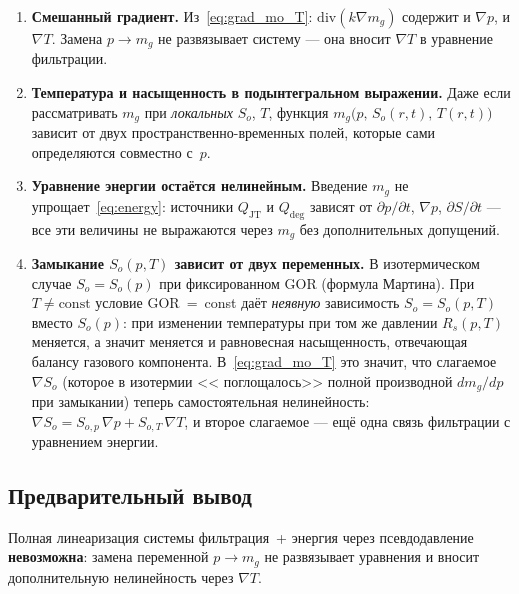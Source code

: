 ﻿\documentclass[12pt,a4paper]{article}
\begin{document}
\begin{enumerate}[label=(\alph*)]
  \item \textbf{Смешанный градиент.}
        Из~\eqref{eq:grad_mo_T}: $\mathrm{div}(k\nabla m_g)$
        содержит и $\nabla p$, и $\nabla T$. Замена $p \to m_g$
        не развязывает систему --- она вносит $\nabla T$
        в уравнение фильтрации.

  \item \textbf{Температура и насыщенность в подынтегральном выражении.}
        Даже если рассматривать $m_g$ при \emph{локальных}
        $S_o$, $T$, функция $m_g\bigl(p,\,S_o(r,t),\,T(r,t)\bigr)$
        зависит от двух пространственно-временных полей, которые
        сами определяются совместно с~$p$.

  \item \textbf{Уравнение энергии остаётся нелинейным.}
        Введение $m_g$ не упрощает~\eqref{eq:energy}:
        источники $Q_{\mathrm{JT}}$ и $Q_{\mathrm{deg}}$
        зависят от $\partial p/\partial t$, $\nabla p$,
        $\partial S/\partial t$ --- все эти величины
        не выражаются через $m_g$ без дополнительных допущений.

  \item \textbf{Замыкание $S_o(p,T)$ зависит от двух переменных.}
        В изотермическом случае $S_o = S_o(p)$ при фиксированном
        GOR (формула Мартина). При $T \neq \mathrm{const}$
        условие GOR~=~const даёт \emph{неявную} зависимость
        $S_o = S_o(p,T)$ вместо $S_o(p)$: при изменении
        температуры при том же давлении $R_s(p,T)$ меняется,
        а значит меняется и равновесная насыщенность,
        отвечающая балансу газового компонента.
        В~\eqref{eq:grad_mo_T} это значит, что слагаемое
        $\nabla S_o$ (которое в изотермии <<
        поглощалось>> полной производной $dm_g/dp$ при
        замыкании) теперь самостоятельная нелинейность:
        $\nabla S_o = S_{o,p}\,\nabla p + S_{o,T}\,\nabla T$,
        и второе слагаемое --- ещё одна связь
        фильтрации с уравнением энергии.
\end{enumerate}

\subsection{Предварительный вывод}\label{ssec:conclusion}

Полная линеаризация системы фильтрация~+ энергия через
псевдодавление \textbf{невозможна}: замена переменной $p \to m_g$
не развязывает уравнения и вносит дополнительную нелинейность через
$\nabla T$.
\end{document}
